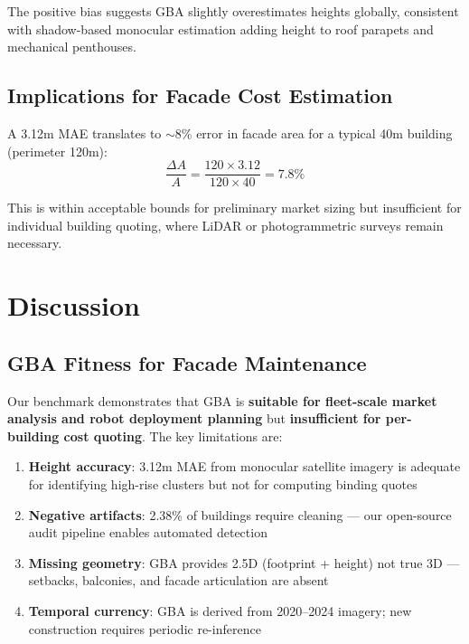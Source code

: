 \documentclass[10pt,twocolumn]{article}
\begin{document}
The positive bias suggests GBA slightly overestimates heights globally, consistent with shadow-based monocular estimation adding height to roof parapets and mechanical penthouses.

\subsection{Implications for Facade Cost Estimation}

A 3.12m MAE translates to $\sim$8\% error in facade area for a typical 40m building (perimeter 120m):
\begin{equation}
  \frac{\Delta A}{A} = \frac{120 \times 3.12}{120 \times 40} = 7.8\%
\end{equation}

This is within acceptable bounds for preliminary market sizing but insufficient for individual building quoting, where LiDAR or photogrammetric surveys remain necessary.

\section{Discussion}
\label{sec:discussion}

\subsection{GBA Fitness for Facade Maintenance}

Our benchmark demonstrates that GBA is \textbf{suitable for fleet-scale market analysis and robot deployment planning} but \textbf{insufficient for per-building cost quoting}. The key limitations are:

\begin{enumerate}
  \item \textbf{Height accuracy}: 3.12m MAE from monocular satellite imagery is adequate for identifying high-rise clusters but not for computing binding quotes
  \item \textbf{Negative artifacts}: 2.38\% of buildings require cleaning --- our open-source audit pipeline enables automated detection
  \item \textbf{Missing geometry}: GBA provides 2.5D (footprint + height) not true 3D --- setbacks, balconies, and facade articulation are absent
  \item \textbf{Temporal currency}: GBA is derived from 2020--2024 imagery; new construction requires periodic re-inference
\end{enumerate}
\end{document}
